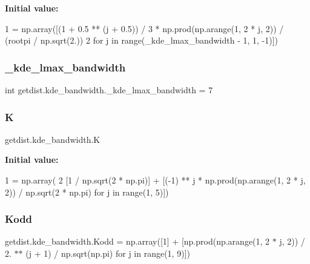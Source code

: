 {\bfseries Initial value\+:}
\begin{DoxyCode}
1 =  np.array([(1 + 0.5 ** (j + 0.5)) / 3 * np.prod(np.arange(1, 2 * j, 2)) / (rootpi / np.sqrt(2.))
2                            \textcolor{keywordflow}{for} j \textcolor{keywordflow}{in} range(\_kde\_lmax\_bandwidth - 1, 1, -1)])
\end{DoxyCode}
\mbox{\label{namespacegetdist_1_1kde__bandwidth_a18140b2db4e2dd0c18a5fcb429f4ea81}} 
\subsubsection{\texorpdfstring{\+\_\+kde\+\_\+lmax\+\_\+bandwidth}{\_kde\_lmax\_bandwidth}}
{\footnotesize\ttfamily int getdist.\+kde\+\_\+bandwidth.\+\_\+kde\+\_\+lmax\+\_\+bandwidth = 7\hspace{0.3cm}{\ttfamily [private]}}

\mbox{\label{namespacegetdist_1_1kde__bandwidth_ae479f48a64078bb494beb949c517f991}} 
\subsubsection{\texorpdfstring{K}{K}}
{\footnotesize\ttfamily getdist.\+kde\+\_\+bandwidth.\+K}

{\bfseries Initial value\+:}
\begin{DoxyCode}
1 =  np.array(
2     [1 / np.sqrt(2 * np.pi)] + [(-1) ** j * np.prod(np.arange(1, 2 * j, 2)) / np.sqrt(2 * np.pi) \textcolor{keywordflow}{for} j \textcolor{keywordflow}{in} 
      range(1, 5)])
\end{DoxyCode}
\mbox{\label{namespacegetdist_1_1kde__bandwidth_ab44d512c76fd1b5bf5c913e7e28c4471}} 
\subsubsection{\texorpdfstring{Kodd}{Kodd}}
{\footnotesize\ttfamily getdist.\+kde\+\_\+bandwidth.\+Kodd = np.\+array(\mbox{[}1\mbox{]} + \mbox{[}np.\+prod(np.\+arange(1, 2 $\ast$ \mbox{\hyperlink{plotcls_8m_ac86694252f8dfdb19aaeadc4b7c342c6}{j}}, 2)) / 2. $\ast$$\ast$ (\mbox{\hyperlink{plotcls_8m_ac86694252f8dfdb19aaeadc4b7c342c6}{j}} + 1) / np.\+sqrt(np.\+pi) for \mbox{\hyperlink{plotcls_8m_ac86694252f8dfdb19aaeadc4b7c342c6}{j}} in range(1, 9)\mbox{]})}


